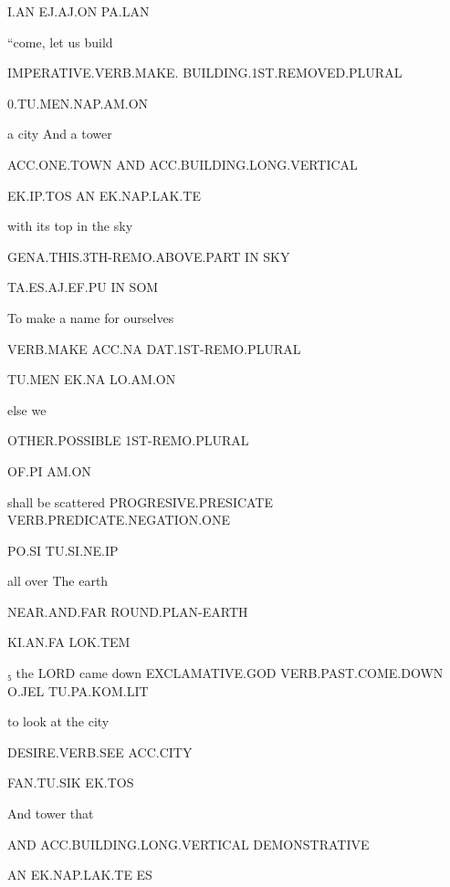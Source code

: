 I.AN			EJ.AJ.ON			PA.LAN 

  

“come, let us build                                                                          

IMPERATIVE.VERB.MAKE. BUILDING.1ST.REMOVED.PLURAL	 

0.TU.MEN.NAP.AM.ON                                                                              

 

a city			And 	a tower	 

ACC.ONE.TOWN		AND	ACC.BUILDING.LONG.VERTICAL 

EK.IP.TOS		AN	EK.NAP.LAK.TE	 

 

with its top 				in           the sky 

GENA.THIS.3TH-REMO.ABOVE.PART	IN	SKY 

TA.ES.AJ.EF.PU				IN	SOM 

  

To make 	a name 		for ourselves		 

VERB.MAKE	ACC.NA		DAT.1ST-REMO.PLURAL	 

TU.MEN	EK.NA		LO.AM.ON 

 

else 			we 

OTHER.POSSIBLE	1ST-REMO.PLURAL 

OF.PI			AM.ON 

 

shall be			    scattered			PROGRESIVE.PRESICATE    VERB.PREDICATE.NEGATION.ONE        

PO.SI			     TU.SI.NE.IP		 

 

all over			The earth 

NEAR.AND.FAR		ROUND.PLAN-EARTH 

KI.AN.FA		LOK.TEM 

 

₅ the LORD 		came down 			EXCLAMATIVE.GOD         VERB.PAST.COME.DOWN		O.JEL			TU.PA.KOM.LIT			 

 

to look			at the city 

DESIRE.VERB.SEE	ACC.CITY 

FAN.TU.SIK		EK.TOS 

  

And 	tower 				that 			 

AND	ACC.BUILDING.LONG.VERTICAL	DEMONSTRATIVE	 

AN	EK.NAP.LAK.TE			ES			 

